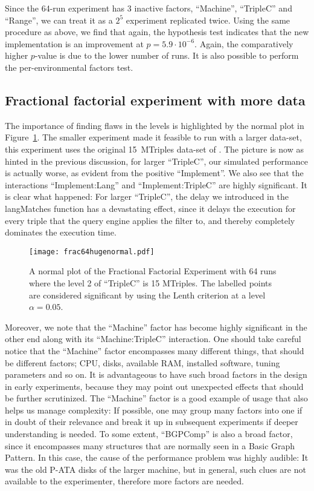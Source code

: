 \documentclass{llncs}
\begin{document}
Since the 64-run experiment has 3 inactive factors, ``Machine'',
``TripleC'' and ``Range'', we can treat it as a $2^5$ experiment
replicated twice. Using the same procedure as above, we find that
again, the hypothesis test indicates that the new implementation is an
improvement at $p = 5.9 \cdot 10^{-6}$. Again, the comparatively
higher $p$-value is due to the lower number of runs. It is also possible
to perform the per-environmental factors test.


\subsection{Fractional factorial experiment with more data}\label{sec:hugefrac}

The importance of finding flaws in the levels is highlighted by the
normal plot in Figure~\ref{fig:frac64hugenormal}. The smaller
experiment made it feasible to run with a larger data-set, this
experiment uses the original 15~MTriples data-set of
\cite{mxro:Morsey2011DBpedia}. The picture is now as hinted in the
previous discussion, for larger ``TripleC'', our simulated performance
is actually worse, as evident from the positive ``Implement''. We also
see that the interactions ``Implement:Lang'' and ``Implement:TripleC''
are highly significant. It is clear what happened: For larger
``TripleC'', the delay we introduced in the langMatches function has a
devastating effect, since it delays the execution for every triple
that the query engine applies the filter to, and thereby completely
dominates the execution time.

\begin{figure}[ht!]
  \centerline{%
  \texttt{[image: frac64hugenormal.pdf]}}
  \caption{A normal plot of the Fractional Factorial Experiment with
    64 runs where the level 2 of ``TripleC'' is 15 MTriples. The
    labelled points are considered significant by using the Lenth
    criterion at a level $\alpha=0.05$.}\label{fig:frac64hugenormal}
\end{figure}


Moreover, we note that the ``Machine'' factor has become highly
significant in the other end along with its ``Machine:TripleC''
interaction. One should take careful notice that the ``Machine''
factor encompasses many different things, that should be different
factors; CPU, disks, available RAM, installed software, tuning
parameters and so on. It is advantageous to have such broad factors in
the design in early experiments, because they may point out unexpected
effects that should be further scrutinized. The ``Machine'' factor is
a good example of usage that also helps us manage complexity: If
possible, one may group many factors into one if in doubt of
their relevance and break it up in subsequent experiments if deeper
understanding is needed. To some extent, ``BGPComp'' is also a broad
factor, since it encompasses many structures that are normally seen in
a Basic Graph Pattern. In this case, the cause of the performance
problem was highly audible: It was the old P-ATA disks of the larger
machine, but in general, such clues are not available to the
experimenter, therefore more factors are needed.
\end{document}
